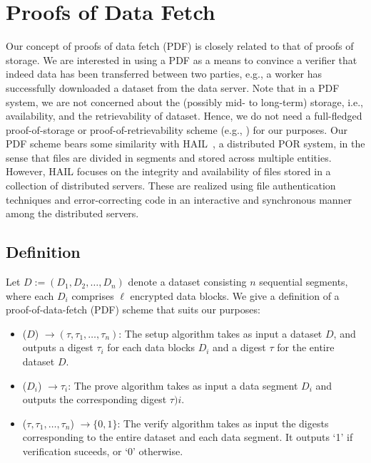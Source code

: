 \section{Proofs of Data Fetch} \label{sect:pdf}

Our concept of proofs of data fetch (PDF) is closely related to that of proofs of storage.
We are interested in using a PDF as a means to convince a verifier that indeed data has been transferred between two parties, e.g., a worker has successfully downloaded a dataset from the data server.
Note that in a PDF system, we are not concerned about the (possibly mid- to long-term) storage, i.e., availability, and the retrievability of dataset.
Hence, we do not need a full-fledged proof-of-storage or proof-of-retrievability scheme (e.g., \cite{JK07,AKK09,SW13}) for our purposes.
Our PDF scheme bears some similarity with HAIL~\cite{BJO09b}, a distributed POR system, in the sense that files are divided in segments and stored across multiple entities.
However, HAIL focuses on the integrity and availability of files stored in a collection of distributed servers.
These are realized using file authentication techniques and error-correcting code in an interactive and synchronous manner among the distributed servers.


\subsection{Definition} \label{sect:pos-definition}

Let $D := (D_1,D_2,\dotsc,D_n)$ denote a dataset consisting $n$ sequential segments, where each $D_i$ comprises $\ell$ encrypted data blocks.
We give a definition of a proof-of-data-fetch (PDF) scheme that suits our purposes:
\begin{itemize}
\item \Setup($D$) $\rightarrow (\tau,\tau_1,\dotsc,\tau_n)$: The setup algorithm takes as input a dataset $D$, and outputs a digest $\tau_i$ for each data blocks $D_i$ and a digest $\tau$ for the entire dataset $D$.

\item \Prove($D_i$) $\rightarrow \tau_i$: The prove algorithm takes as input a data segment $D_i$ and outputs the corresponding digest $\tau)i$.

\item \Verify($\tau, \tau_1,\dotsc,\tau_n$) $\rightarrow \{0,1\}$: The verify algorithm takes as input the digests corresponding to the entire dataset and each data segment. It outputs `1' if verification suceeds, or `0' otherwise.
\end{itemize}

